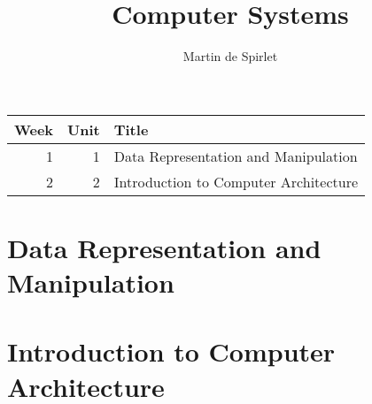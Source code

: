 \documentclass[
  11pt,
  a4paper,
]{article}
\title{Computer Systems}
\author{Martin de Spirlet}
\date{}
\begin{document}

\maketitle

\vspace*{\fill}

\begin{table}[htp]
  \centering
  \begin{tabular}{rrl}
    \toprule
    Week & Unit & Title \\
    \midrule
     1 &  1 & Data Representation and Manipulation \\[1ex]
     2 &  2 & Introduction to Computer Architecture \\
    \bottomrule
  \end{tabular}
\end{table}

\vspace*{\fill}
\addvspace{1in}

\clearpage


\section{Data Representation and Manipulation}


\section{Introduction to Computer Architecture}

\end{document}
